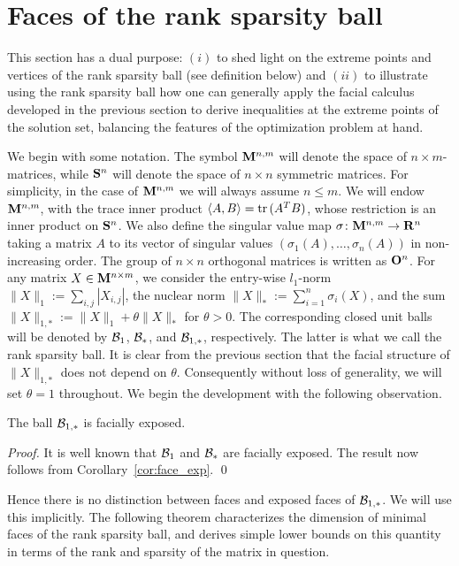 \documentclass[smallextended,numbook]{svjour3}
\begin{document}
\section{Faces of the rank sparsity ball}\label{sec:rank_sp}
This section has a dual purpose: $(i)$ to shed light on the extreme points and vertices of the rank sparsity ball (see definition below) and $(ii)$ to illustrate using the rank sparsity ball how one can generally apply the facial calculus developed in the previous section to derive inequalities at the extreme points of the solution set, balancing the features of the optimization problem at hand.

We begin with some notation. The symbol  ${\bf M}^{n,m}$ will denote the space of $n\times m$-matrices, while ${\bf S}^n$ will denote the space of $n\times n$ symmetric matrices. For simplicity, in the case of ${\bf M}^{n,m}$ we will always assume $n \leq m$. We will endow ${\bf M}^{n,m}$, with the trace inner product $\langle A,B \rangle ={\mbox{\rm tr}\,}(A^{T}B)$, whose restriction is an inner product on ${\bf S}^n$.
We also define the singular value map $\sigma\colon {\bf M}^{n,m} \to {{\bf R}}^{n}$ taking a matrix $A$ to its vector of singular values $(\sigma_1(A),\ldots,\sigma_n(A))$ in non-increasing order. 
The group of $n\times n$ orthogonal matrices is written as ${\bf O}^n$. For any matrix $X\in {\bf M}^{n\times m}$, we consider the entry-wise $l_1$-norm $\|X\|_1:= \sum_{i,j} |X_{i,j}|$, the nuclear norm $\|X\|_*:= \sum^n_{i=1} \sigma_i(X)$, and the sum $\|X\|_{1,*}:=\|X\|_1+\theta\|X\|_{*}$ for $\theta >0$. The corresponding closed unit balls will be denoted by ${{\cal B}}_{1}$, ${{\cal B}}_{*}$, and ${{\cal B}}_{1,*}$, respectively. The latter is what we call the rank sparsity ball. It is clear from the previous section that the facial structure of $\|X\|_{1,*}$ does not depend on $\theta$. Consequently without loss of generality, we will set $\theta=1$ throughout. We begin the development with the following observation.
\begin{thm}
The ball ${{\cal B}}_{1,*}$ is facially exposed.
\end{thm}
\begin{proof}
It is well known that ${{\cal B}}_{1}$ and ${{\cal B}}_{*}$ are facially exposed. The result now follows from Corollary~\ref{cor:face_exp}. \qed
\end{proof}
Hence there is no distinction between faces and exposed faces of ${{\cal B}}_{1,*}$. We will use this implicitly. The following theorem characterizes the dimension of minimal faces of the rank sparsity ball, and derives simple lower bounds on this quantity in terms of the rank and sparsity of the matrix in question. 
\end{document}
